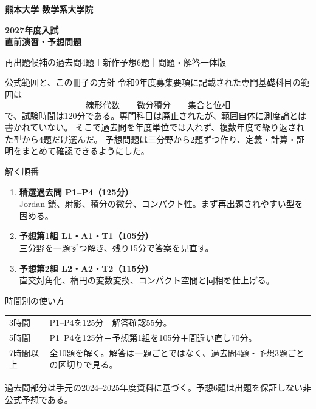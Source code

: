 \documentclass[uplatex,dvipdfmx,10pt]{jsarticle}
\begin{document}
\begin{titlepage}
\thispagestyle{empty}
\vspace*{13mm}
{\color{navy}\bfseries\large 熊本大学 数学系大学院}\par
\vspace{3mm}
{\Huge\bfseries
2027年度入試\\[2mm]直前演習・予想問題}\par
\vspace{4mm}
{\large 再出題候補の過去問4題＋新作予想6題｜問題・解答一体版}\par

\vspace{9mm}
\begin{routebox}{公式範囲と、この冊子の方針}
令和9年度募集要項に記載された専門基礎科目の範囲は
\[
\boxed{\text{線形代数}\qquad\text{微分積分}\qquad\text{集合と位相}}
\]
で、試験時間は120分である。専門科目は廃止されたが、範囲自体に測度論とは書かれていない。
そこで過去問を年度単位では入れず、複数年度で繰り返された型から4題だけ選んだ。
予想問題は三分野から2題ずつ作り、定義・計算・証明をまとめて確認できるようにした。
\end{routebox}

\begin{routebox}{解く順番}
\begin{enumerate}
  \item \textbf{精選過去問 P1--P4（125分）}\\
  Jordan 鎖、射影、積分の微分、コンパクト性。まず再出題されやすい型を固める。
  \item \textbf{予想第1組 L1・A1・T1（105分）}\\
  三分野を一題ずつ解き、残り15分で答案を見直す。
  \item \textbf{予想第2組 L2・A2・T2（115分）}\\
  直交対角化、楕円の変数変換、コンパクト空間と同相を仕上げる。
\end{enumerate}
\end{routebox}

\begin{routebox}{時間別の使い方}
\begin{tabular}{@{}p{24mm}p{125mm}@{}}
3時間 & P1--P4を125分＋解答確認55分。\\
5時間 & P1--P4を125分＋予想第1組を105分＋間違い直し70分。\\
7時間以上 & 全10題を解く。解答は一題ごとではなく、過去問4題・予想3題ごとの区切りで見る。\\
\end{tabular}
\end{routebox}

\vfill
{\small\color{muted}
過去問部分は手元の2024–2025年度資料に基づく。予想6題は出題を保証しない非公式予想である。}
\end{titlepage}

\tableofcontents


\end{document}
